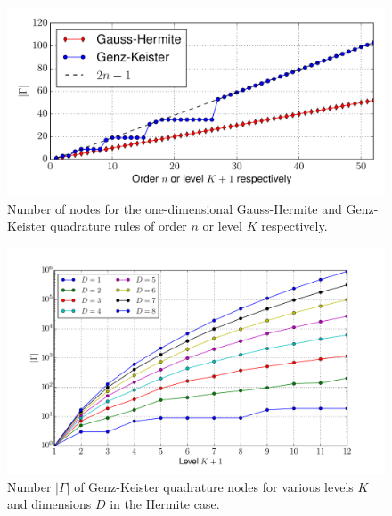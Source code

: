\documentclass[a4paper,10pt]{article}
\begin{document}
\begin{figure}
  \centering
  \includegraphics[width=\linewidth]{./img/number_nodes_hermitephy.pdf}
  \caption{Number of nodes for the one-dimensional Gauss-Hermite and Genz-Keister quadrature
  rules of order $n$ or level $K$ respectively.}
  \label{fig:number_nodes_hermitephy}
\end{figure}

\begin{figure}
  \centering
  \includegraphics[width=\linewidth]{./img/number_nodes_levdim_hermitephy.pdf}
  \caption{Number $|\Gamma|$ of Genz-Keister quadrature nodes for various
  levels $K$ and dimensions $D$ in the Hermite case.}
  \label{fig:number_nodes_levdim_hermitephy}
\end{figure}
\end{document}
